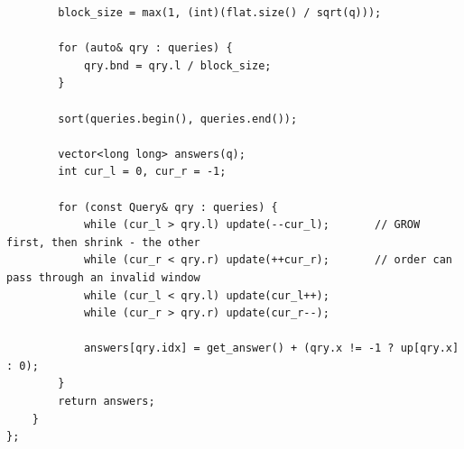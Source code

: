 \documentclass[9pt,a4paper,twocolumn]{extarticle}
\begin{document}
\begin{lstlisting}
        block_size = max(1, (int)(flat.size() / sqrt(q)));
        
        for (auto& qry : queries) {
            qry.bnd = qry.l / block_size;
        }

        sort(queries.begin(), queries.end());

        vector<long long> answers(q);
        int cur_l = 0, cur_r = -1;

        for (const Query& qry : queries) {
            while (cur_l > qry.l) update(--cur_l);       // GROW first, then shrink - the other
            while (cur_r < qry.r) update(++cur_r);       // order can pass through an invalid window
            while (cur_l < qry.l) update(cur_l++);
            while (cur_r > qry.r) update(cur_r--);

            answers[qry.idx] = get_answer() + (qry.x != -1 ? up[qry.x] : 0);
        }
        return answers;
    }
};
\end{lstlisting}

\filbreak
\end{document}
